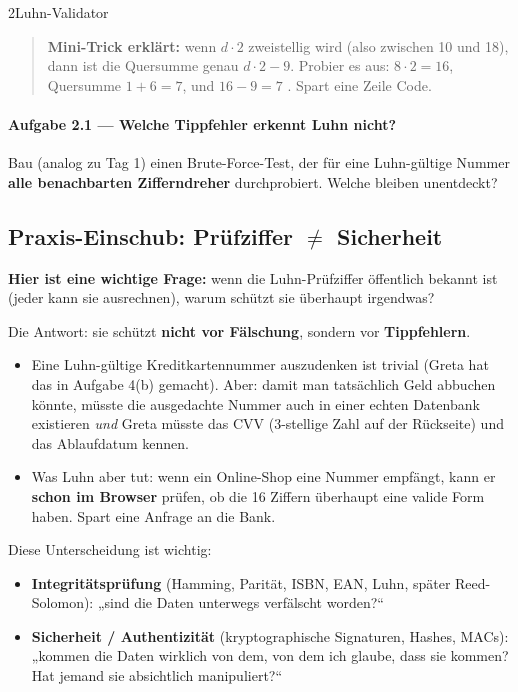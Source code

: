 \begin{pythoneinheit}{2}{Luhn-Validator}

\begin{quote}
\textbf{Mini-Trick erklärt:} wenn $d \cdot 2$ zweistellig wird (also
zwischen 10 und 18), dann ist die Quersumme genau $d \cdot 2 - 9$.
Probier es aus: $8 \cdot 2 = 16$, Quersumme $1+6 = 7$, und $16 - 9 =
7$ \checkmark. Spart eine Zeile Code.
\end{quote}

\paragraph{Aufgabe 2.1 — Welche Tippfehler erkennt Luhn nicht?}
Bau (analog zu Tag 1) einen Brute-Force-Test, der für eine Luhn-gültige
Nummer \textbf{alle benachbarten Zifferndreher} durchprobiert. Welche
bleiben unentdeckt?
\end{pythoneinheit}

\subsection*{Praxis-Einschub: Prüfziffer $\ne$ Sicherheit}

\textbf{Hier ist eine wichtige Frage:} wenn die Luhn-Prüfziffer
öffentlich bekannt ist (jeder kann sie ausrechnen), warum schützt sie
überhaupt irgendwas?

Die Antwort: sie schützt \textbf{nicht vor Fälschung}, sondern vor
\textbf{Tippfehlern}.

\begin{itemize}
\item Eine Luhn-gültige Kreditkartennummer auszudenken ist trivial
  (Greta hat das in Aufgabe 4(b) gemacht). Aber: damit man tatsächlich
  Geld abbuchen könnte, müsste die ausgedachte Nummer auch in einer
  echten Datenbank existieren \emph{und} Greta müsste das CVV
  (3-stellige Zahl auf der Rückseite) und das Ablaufdatum kennen.
\item Was Luhn aber tut: wenn ein Online-Shop eine Nummer empfängt,
  kann er \textbf{schon im Browser} prüfen, ob die 16 Ziffern
  überhaupt eine valide Form haben. Spart eine Anfrage an die Bank.
\end{itemize}

Diese Unterscheidung ist wichtig:
\begin{itemize}
\item \textbf{Integritätsprüfung} (Hamming, Parität, ISBN, EAN, Luhn,
  später Reed-Solomon): „sind die Daten unterwegs verfälscht worden?“
\item \textbf{Sicherheit / Authentizität} (kryptographische Signaturen,
  Hashes, MACs): „kommen die Daten wirklich von dem, von dem ich
  glaube, dass sie kommen? Hat jemand sie absichtlich manipuliert?“
\end{itemize}


